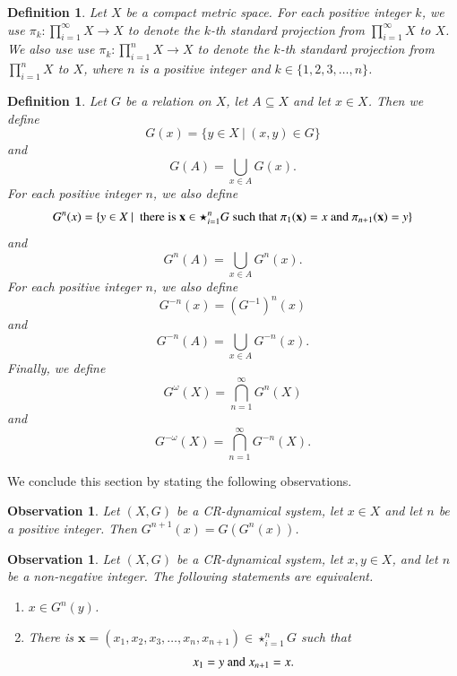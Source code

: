 \documentclass[a4paper,12pt]{article} %
\newtheorem{definition}[theorem]{Definition}
\newtheorem{observation}[theorem]{Observation}
\begin{document}
%
%
%
\begin{definition}
Let $X$ be a compact metric space.  For each positive integer $k$,  we use $\pi_k:\prod_{i=1}^{\infty}X\rightarrow X$ to denote \emph{ \color{blue}  the $k$-th standard projection} from $\prod_{i=1}^{\infty}X$ to $X$. We also use use $\pi_k:\prod_{i=1}^{n}X\rightarrow X$ to denote \emph{ \color{blue}  the $k$-th standard projection} from $\prod_{i=1}^{n}X$ to $X$, where $n$ is a positive integer and $k\in \{1,2,3,\ldots, n\}$. 
\end{definition}
\begin{definition}
Let $G$ be a relation on $X$, let $A\subseteq X$ and let $x\in X$.  Then we define 
$$
G(x)=\{y\in X \ | \ (x,y)\in G\}
$$
and 
$$
G(A)=\bigcup_{x\in A}G(x).
$$ 
For each positive integer $n$, we also define
$$
G^n(x)=\{y\in X \ | \ \textup{ there is } \mathbf x\in \star_{i=1}^{n}G \textup{ such that } \pi_1(\mathbf x)=x \textup{ and } \pi_{n+1}(\mathbf x)=y\}
$$
and 
$$
G^n(A)=\bigcup_{x\in A}G^n(x).
$$
For each positive integer $n$, we also define
$$
G^{-n}(x)=(G^{-1})^n(x)
$$
and 
$$
G^{-n}(A)=\bigcup_{x\in A}G^{-n}(x).
$$
Finally, we define
$$
G^{\omega}(X)=\bigcap_{n=1}^{\infty}G^{n}(X)
$$
and
$$
G^{-\omega}(X)=\bigcap_{n=1}^{\infty}G^{-n}(X).
$$
\end{definition}
We conclude this section by stating the following observations.
\begin{observation}\label{encica}
Let $(X,G)$ be a CR-dynamical system,  let $x\in X$ and let $n$ be a positive integer. Then $G^{n+1}(x)=G(G^n(x))$.
\end{observation}
\begin{observation}\label{dvojcica}
Let $(X,G)$ be a CR-dynamical system,  let $x,y\in X$, and let $n$ be a non-negative integer.  The following statements are equivalent.
\begin{enumerate}
\item $x\in G^n(y)$. 
\item There is $\mathbf x=(x_1,x_2,x_3,\ldots, x_{n},x_{n+1})\in \star_{i=1}^{n}G$ such that 
$$
x_1=y \textup{ and } x_{n+1}=x.
$$
\end{enumerate} 
\end{observation}
\end{document}
